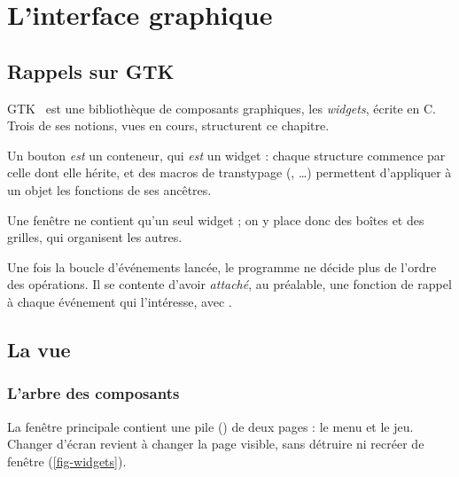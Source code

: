 \chapter{L'interface graphique}
\label{chap-interface}

\section{Rappels sur GTK}

GTK~\cite{gtk3} est une bibliothèque de composants graphiques, les \emph{widgets}, écrite
en C. Trois
de ses notions, vues en cours, structurent ce chapitre.

\begin{description}[style=nextline, leftmargin=1.2em]
  \item[Héritage par inclusion] Un bouton \emph{est} un conteneur, qui \emph{est} un
    widget : chaque structure commence par celle dont elle hérite, et des macros de
    transtypage (, \dots) permettent d'appliquer à un
    objet les fonctions de ses ancêtres.
  \item[Conteneurs] Une fenêtre ne contient qu'un seul widget ; on y place donc des boîtes
    et des grilles, qui organisent les autres.
  \item[Programmation événementielle] Une fois la boucle d'événements lancée, le programme
    ne décide plus de l'ordre des opérations. Il se contente d'avoir \emph{attaché}, au
    préalable, une fonction de rappel à chaque événement qui l'intéresse, avec
    .
\end{description}

\section{La vue}

\subsection{L'arbre des composants}

La fenêtre principale contient une pile () de deux pages : le menu et le jeu.
Changer d'écran revient à changer la page visible, sans détruire ni recréer de fenêtre
(\cref{fig-widgets}).

